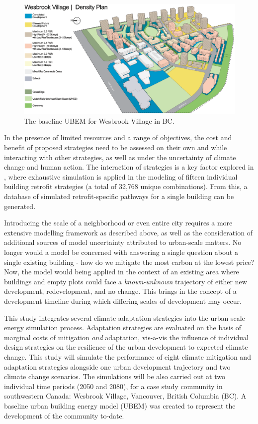 \documentclass[twocolumn, a4paper,10pt]{article}
\begin{document}
\begin{figure}[hbpt]
    \centering
    \includegraphics[scale=0.50]{figures/wesbrook_plan.eps}
    \caption{The baseline UBEM for Wesbrook Village in BC.}
    \label{fig:wesbrook_base}
\end{figure}

In the presence of limited resources and a range of objectives, the cost and benefit of proposed strategies need to be assessed on their own and while interacting with other strategies, as well as under the uncertainty of climate change and human action. The interaction of strategies is a key factor explored in \citet{rysanek_using_2013}, where exhaustive simulation is applied in the modeling of fifteen individual building retrofit strategies (a total of 32,768 unique combinations). From this, a database of simulated retrofit-specific pathways for a single building can be generated.

Introducing the scale of a neighborhood or even entire city requires a more extensive modelling framework as described above, as well as the consideration of additional sources of model uncertainty attributed to urban-scale matters. No longer would a model be concerned with answering a single question about a single existing building - how do we mitigate the most carbon at the lowest price? Now, the model would  being applied in the context of an existing area where buildings and empty plots could face a \textit{known-unknown} trajectory of either new development, redevelopment, and no change. This brings in the concept of a development timeline during which differing scales of development may occur.

This study integrates several climate adaptation strategies into the urban-scale energy simulation process. Adaptation strategies are evaluated on the basis of marginal costs of mitigation \textit{and} adaptation, vis-a-vis the influence of individual design strategies on the resilience of the urban development to expected climate change. This study will simulate the performance of eight climate mitigation and adaptation strategies alongside one urban development trajectory and two climate change scenarios. The simulations will be also carried out at two individual time periods (2050 and 2080), for a case study community in southwestern Canada: Wesbrook Village, Vancouver, British Columbia (BC). A baseline urban building energy model (UBEM) was created to represent the development of the community to-date.
\end{document}

